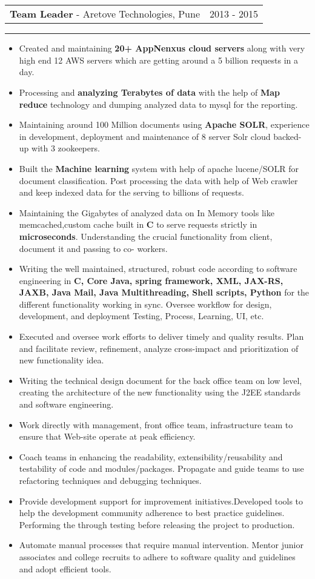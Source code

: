 \documentclass[10pt,A4]{article}
\newcommand{\cvevent}[4]
{

\begin{tabular*}{1\textwidth}{p{13.6cm}  x{3.9cm}}
	\textbf{#2} - \textcolor{bgcol}{#3} &   \vspace{2.0pt}\textcolor{sectcol}{#1}
\end{tabular*}

\vspace{-8pt}
\textcolor{softcol}{\hrule}
\vspace{6pt}

  #4 

}
\begin{document}
\ \\ \\

\cvevent{2013 - 2015}
{Team Leader}
{Aretove Technologies, Pune}
{
\begin{itemize}

\item Created and maintaining \textbf{20+ AppNenxus cloud servers} along with very high end 12 AWS servers which are getting around a 5 billion requests in a day.

\item Processing and \textbf{analyzing Terabytes of data} with the help of \textbf{Map reduce} 
technology and dumping analyzed data to mysql for the reporting.

\item Maintaining around 100 Million documents using \textbf{Apache SOLR}, experience in
development, deployment and maintenance of 8 server Solr cloud backed-up with 3
zookeepers.
\item Built the \textbf{Machine learning} system with help of apache lucene/SOLR for document
classification. Post processing the data with help of Web crawler and keep indexed data for the
serving to billions of requests.
\item Maintaining the Gigabytes of analyzed data on In Memory tools like
memcached,custom cache built in \textbf{C} to serve requests strictly in \textbf{microseconds}.
Understanding the crucial functionality from client, document it and passing to co-
workers.
\item Writing the well maintained, structured, robust code according to software engineering
in \textbf{C, Core Java, spring framework, XML, JAX-RS, JAXB, Java Mail, Java
Multithreading, Shell scripts, Python} for the different functionality working in sync.
Oversee workflow for design, development, and deployment Testing, Process,
Learning, UI, etc.
\item Executed and oversee work efforts to deliver timely and quality results.
Plan and facilitate review, refinement, analyze cross-impact and prioritization of
new functionality idea.
\item Writing the technical design document for the back office team on low level,
creating the architecture of the new functionality using the J2EE standards and software
engineering.
\item Work directly with management, front office team, infrastructure team to ensure that
Web-site operate at peak efficiency.
\item Coach teams in enhancing the readability, extensibility/reusability and
testability of code and modules/packages. Propagate and guide teams to use refactoring techniques and debugging
techniques.
\item Provide development support for improvement initiatives.Developed tools to help the development community adherence to best practice
guidelines. Performing the through testing before releasing the project to production.
\item Automate manual processes that require manual intervention.
Mentor junior associates and college recruits to adhere to software quality and
guidelines and adopt efficient tools.


\end{itemize}}
\end{document}
